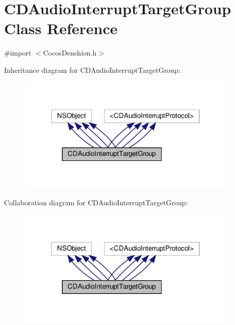 \hypertarget{interfaceCDAudioInterruptTargetGroup}{}\section{C\+D\+Audio\+Interrupt\+Target\+Group Class Reference}
\label{interfaceCDAudioInterruptTargetGroup}


{\ttfamily \#import $<$Cocos\+Denshion.\+h$>$}



Inheritance diagram for C\+D\+Audio\+Interrupt\+Target\+Group\+:
\nopagebreak
\begin{figure}[H]
\begin{center}
\leavevmode
\includegraphics[width=298pt]{interfaceCDAudioInterruptTargetGroup__inherit__graph}
\end{center}
\end{figure}


Collaboration diagram for C\+D\+Audio\+Interrupt\+Target\+Group\+:
\nopagebreak
\begin{figure}[H]
\begin{center}
\leavevmode
\includegraphics[width=298pt]{interfaceCDAudioInterruptTargetGroup__coll__graph}
\end{center}
\end{figure}
